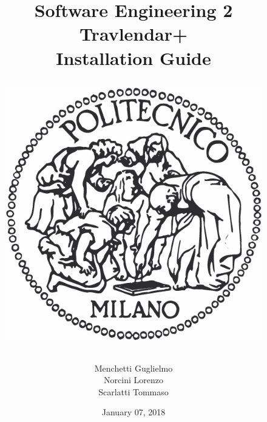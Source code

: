 \documentclass[12pt, a4paper]{article}
\begin{document}
\title{Software Engineering 2\\ \vspace{1em}  {\textbf{Travlendar+}} \\ \vspace{1em} \textbf{I}nstallation \textbf{G}uide
	\vspace{1.5em}
\begin{figure}[H]
	\centering
	\includegraphics[scale=0.4]{logo}
\end{figure}
}
\author{Menchetti Guglielmo\\ Norcini Lorenzo \\ Scarlatti Tommaso}

\date{January 07, 2018}

\maketitle

\newpage
\tableofcontents

\newpage


\end{document}
